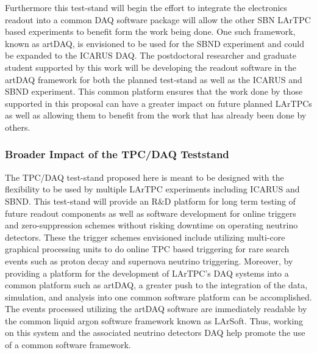 Furthermore this test-stand will begin the effort to integrate the electronics readout into a common DAQ software package will allow the other SBN LArTPC based experiments to benefit form the work being done. One such framework, known as artDAQ, is envisioned to be used for the SBND experiment and could be expanded to the ICARUS DAQ. The postdoctoral researcher and graduate student supported by this work will be developing the readout software in the artDAQ framework for both the planned test-stand as well as the ICARUS and SBND experiment. This common platform ensures that the work done by those supported in this proposal can have a greater impact on future planned LArTPCs as well as allowing them to benefit from the work that has already been done by others.

\subsubsection{Broader Impact of the TPC/DAQ Teststand}\label{sec:impactTeststand}
The TPC/DAQ test-stand proposed here is meant to be designed with the flexibility to be used by multiple LArTPC experiments including ICARUS and SBND. This test-stand will provide an R$\&$D platform for long term testing of future readout components as well as software development for online triggers and zero-suppression schemes without risking downtime on operating neutrino detectors. These the trigger schemes envisioned include utilizing multi-core graphical processing units to do online TPC based triggering for rare search events such as proton decay and supernova neutrino triggering. Moreover, by providing a platform for the development of LArTPC's DAQ systems into a common platform such as artDAQ, a greater push to the integration of the data, simulation, and analysis into one common software platform can be accomplished. The events processed utilizing the artDAQ software are immediately readable by the common liquid argon software framework known as LArSoft. Thus, working on this system and the associated neutrino detectors DAQ help promote the use of a common software framework.
